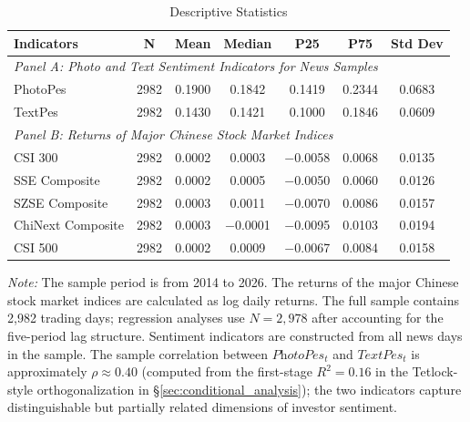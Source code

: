 \documentclass[AER]{AEA}
\begin{document}
\begin{table}[h!]
    \caption{Descriptive Statistics}
    \label{tab:descriptive_statistics}
    \centering
    \setlength{\tabcolsep}{4pt} %
    \small %
    \begin{tabular}{lcccccc}
        \toprule
        Indicators & N & Mean & Median & P25 & P75 & Std Dev \\
        \midrule
        \multicolumn{7}{l}{\textit{Panel A: Photo and Text Sentiment Indicators for News Samples}} \\
        \midrule
        PhotoPes & 2982 & 0.1900 & 0.1842 & 0.1419 & 0.2344 & 0.0683 \\
        TextPes & 2982 & 0.1430 & 0.1421 & 0.1000 & 0.1846 & 0.0609 \\
        \midrule
        \multicolumn{7}{l}{\textit{Panel B: Returns of Major Chinese Stock Market Indices}} \\
        \midrule
        CSI 300 & 2982 & 0.0002 & 0.0003 & $-$0.0058 & 0.0068 & 0.0135 \\
        SSE Composite & 2982 & 0.0002 & 0.0005 & $-$0.0050 & 0.0060 & 0.0126 \\
        SZSE Composite & 2982 & 0.0003 & 0.0011 & $-$0.0070 & 0.0086 & 0.0157 \\
        ChiNext Composite & 2982 & 0.0003 & $-$0.0001 & $-$0.0095 & 0.0103 & 0.0194 \\
        CSI 500 & 2982 & 0.0002 & 0.0009 & $-$0.0067 & 0.0084 & 0.0158 \\
        \bottomrule
    \end{tabular}

    \vspace{0.2cm}
    \footnotesize
    \textit{Note:} The sample period is from 2014 to 2026. The returns of the major Chinese stock market indices are calculated as log daily returns. The full sample contains 2{,}982 trading days; regression analyses use $N=2{,}978$ after accounting for the five-period lag structure. Sentiment indicators are constructed from all news days in the sample. The sample correlation between $\textit{PhotoPes}_t$ and $\textit{TextPes}_t$ is approximately $\rho \approx 0.40$ (computed from the first-stage $R^2 = 0.16$ in the Tetlock-style orthogonalization in \S\ref{sec:conditional_analysis}); the two indicators capture distinguishable but partially related dimensions of investor sentiment.
\end{table}
\end{document}
